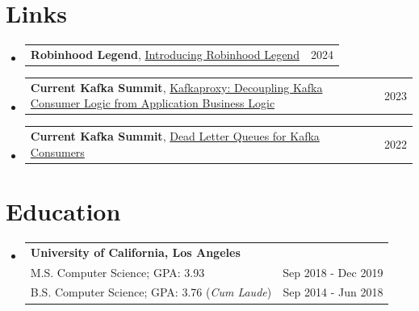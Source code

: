 \documentclass[letterpaper,10.8pt]{article}
\makeatletter
\newcommand{\resumeItemNoBullet}[2]{
  \item[$ $]\small{
    \textbf{#1}{: #2 \vspace{-2pt}}
  }
}
\newcommand{\resumeItemBullet}[1]{
  \item[$\circ$]\small{{#1 \vspace{-2pt}}
  }
}
\newcommand{\resumeSubheadingActivity}[3]{
  \vspace{0pt}\item[$ $]
    \begin{tabular*}{0.97\textwidth}{l@{\extracolsep{\fill}}r}
      \textbf{#1} & \small #3 \\
      \small #2 \\
    \end{tabular*}
  \vspace{-7pt}
}
\newcommand{\resumeLink}[3]{
  \vspace{0pt}\item[$ $]
    \begin{tabular*}{0.97\textwidth}{l@{\extracolsep{\fill}}r}
      \textbf{\small #1}, \small #2 & \small #3 \\
    \end{tabular*}
  \vspace{-7pt}
}
\newcommand{\resumeSubheadingTwo}[5]{
  \vspace{-2pt}\item[$ $]
    \begin{tabular*}{0.97\textwidth}{l@{\extracolsep{\fill}}r}
      \textbf{#1} & \\
      \small#2 & \small #3 \\
      \small#4 & \small #5 \\
    \end{tabular*}
  \vspace{-5pt}
}
\newcommand{\resumeSubItem}[2]{\resumeItemNoBullet{#1}{#2}\vspace{-4pt}}
\newcommand{\resumeSubHeadingListStart}{\begin{itemize}[leftmargin=*]}
\newcommand{\resumeSubHeadingListEnd}{\end{itemize}}
\newcommand{\resumeItemListStart}{\begin{itemize}}
\newcommand{\resumeItemListEnd}{\end{itemize}\vspace{-5pt}}
\makeatother
\begin{document}
\section{Links}
\resumeSubHeadingListStart
  \resumeLink
  {Robinhood Legend}{\href{https://newsroom.aboutrobinhood.com/the-legend-awakens/}{Introducing Robinhood Legend}}{2024}
  \resumeLink
  {Current Kafka Summit}{\href{https://www.confluent.io/events/current/2023/robinhoods-kafkaproxy-decoupling-kafka-consumer-logic-from-application/}{Kafkaproxy: Decoupling Kafka Consumer Logic from Application Business Logic}}{2023}
  \resumeLink
  {Current Kafka Summit}{\href{https://www.confluent.io/events/current-2022/dead-letter-queues-for-kafka-consumers-in-robinhood/}{Dead Letter Queues for Kafka Consumers}}{2022}
\resumeSubHeadingListEnd

\section{Education}
\resumeSubHeadingListStart
    \resumeSubheadingTwo
      {University of California, Los Angeles}
      {M.S. Computer Science;  GPA: 3.93}{Sep 2018 - Dec 2019}
      {B.S. Computer Science;  GPA: 3.76 (\textit{Cum Laude})}{Sep 2014 - Jun 2018}
    

\resumeSubHeadingListEnd

\end{document}
